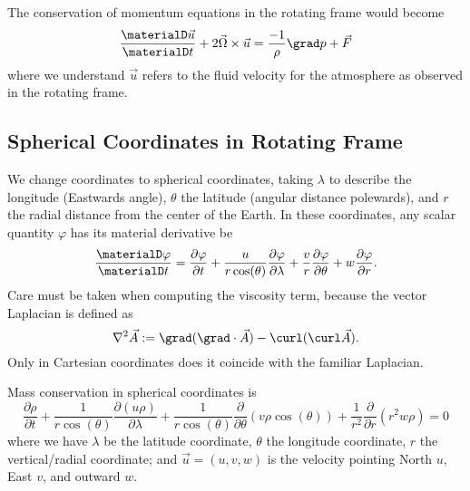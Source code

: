 The conservation of momentum equations in the rotating frame would
become
\begin{equation}
  \frac{\materialD\vec{u}}{\materialD t} + 2\vec{\Omega}\times\vec{u}
  = \frac{-1}{\rho}\grad p + \vec{F}
\end{equation}
where we understand $\vec{u}$ refers to the fluid velocity for the
atmosphere as observed in the rotating frame.

\subsection{Spherical Coordinates in Rotating Frame}

We change coordinates to spherical coordinates, taking $\lambda$ to
describe the longitude (Eastwards angle), $\theta$ the latitude (angular
distance polewards), and $r$ the radial distance from the center of the
Earth. In these coordinates, any scalar quantity $\varphi$ has its
material derivative be
\begin{equation}
  \frac{\materialD\varphi}{\materialD t}
  = \frac{\partial\varphi}{\partial t}
    + \frac{u}{r\cos(\theta)}\frac{\partial\varphi}{\partial\lambda}
    + \frac{v}{r}\frac{\partial\varphi}{\partial\theta}
    + w\frac{\partial\varphi}{\partial r}.
\end{equation}
Care must be taken when computing the viscosity term, because the vector
Laplacian is defined as
\begin{equation}
  \nabla^{2}\vec{A} := \grad(\grad\cdot\vec{A}) - \curl(\curl\vec{A}).
\end{equation}
Only in Cartesian coordinates does it coincide with the familiar Laplacian.

\begin{prop}
  Mass conservation in spherical coordinates is
  \begin{equation}
    \frac{\partial\rho}{\partial t}
    + \frac{1}{r\cos(\theta)}\frac{\partial(u\rho)}{\partial\lambda}
    + \frac{1}{r\cos(\theta)}\frac{\partial}{\partial\theta}(v\rho\cos(\theta))
    + \frac{1}{r^{2}}\frac{\partial}{\partial r}(r^{2}w\rho)
    = 0
  \end{equation}
  where we have $\lambda$ be the latitude coordinate, $\theta$ the
  longitude coordinate, $r$ the vertical/radial coordinate; and
  $\vec{u}=(u,v,w)$ is the velocity pointing North $u$, East $v$, and
  outward $w$.
\end{prop}


